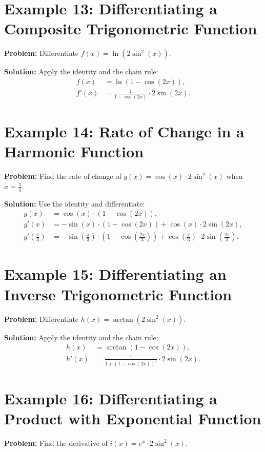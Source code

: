 \documentclass[a4paper,12pt]{book}
\begin{document}
\section*{Example 13: Differentiating a Composite Trigonometric Function}
\textbf{Problem:} Differentiate \(f(x) = \ln(2 \sin^2(x))\).

\textbf{Solution:}
Apply the identity and the chain rule:
\begin{align*}
f(x) &= \ln(1 - \cos(2x)), \\
f'(x) &= \frac{1}{1 - \cos(2x)} \cdot 2 \sin(2x).
\end{align*}

\section*{Example 14: Rate of Change in a Harmonic Function}
\textbf{Problem:} Find the rate of change of \(g(x) = \cos(x) \cdot 2 \sin^2(x)\) when \(x = \frac{\pi}{3}\).

\textbf{Solution:}
Use the identity and differentiate:
\begin{align*}
g(x) &= \cos(x) \cdot (1 - \cos(2x)), \\
g'(x) &= -\sin(x) \cdot (1 - \cos(2x)) + \cos(x) \cdot 2 \sin(2x), \\
g'\left(\frac{\pi}{3}\right) &= -\sin\left(\frac{\pi}{3}\right) \cdot \left(1 - \cos\left(\frac{2\pi}{3}\right)\right) + \cos\left(\frac{\pi}{3}\right) \cdot 2 \sin\left(\frac{2\pi}{3}\right).
\end{align*}

\section*{Example 15: Differentiating an Inverse Trigonometric Function}
\textbf{Problem:} Differentiate \(h(x) = \arctan(2 \sin^2(x))\).

\textbf{Solution:}
Apply the identity and the chain rule:
\begin{align*}
h(x) &= \arctan(1 - \cos(2x)), \\
h'(x) &= \frac{1}{1 + (1 - \cos(2x))^2} \cdot 2 \sin(2x).
\end{align*}

\section*{Example 16: Differentiating a Product with Exponential Function}
\textbf{Problem:} Find the derivative of \(i(x) = e^x \cdot 2 \sin^2(x)\).
\end{document}
